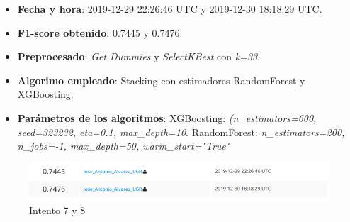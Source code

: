 \documentclass[11pt,a4paper]{article}
\begin{document}
	\begin{itemize}
		\item \textbf{Fecha y hora}: 2019-12-29 22:26:46 UTC y 2019-12-30 18:18:29 UTC.
		\item \textbf{F1-score obtenido}: 0.7445 y 0.7476.
		\item \textbf{Preprocesado}: \emph{Get Dummies} y \emph{SelectKBest} con \emph{k=33}.
		\item \textbf{Algorimo empleado}: Stacking con estimadores RandomForest y XGBoosting.
		\item \textbf{Parámetros de los algoritmos}: XGBoosting: \emph{(n\_estimators=600, seed=323232, eta=0.1, max\_depth=10}. RandomForest: \emph{n\_estimators=200, n\_jobs=-1, max\_depth=50, warm\_start="True"}
	\end{itemize}
	
	\begin{figure}[H] 
		\centering
		\includegraphics[scale=0.6]{../capturas/T78}
		\caption{Intento 7 y 8}
	\end{figure}
		
	
\end{document}

